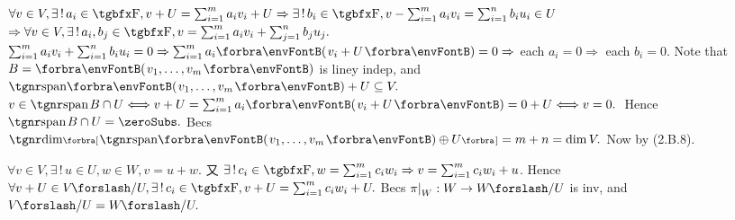 $\forall v\in V,\exists\,!\,a_i\in\Fbb,v+U=\sum_{i=1}^m a_i v_i+U\Rightarrow\exists\,!\,b_i\in\Fbb,v-\sum_{i=1}^m a_i v_i=\sum_{i=1}^n b_i u_i\in U$\parSol{\vspace{2pt}}
$\Rightarrow \forall v\in V,\exists\,!\,a_i,b_j\in\Fbb,v=\sum_{i=1}^m a_i v_i+\sum_{j=1}^n b_j u_j.$\PfEnd\parSol{\vspace{6pt}}
\Or $\sum_{i=1}^m a_i v_i+\sum_{i=1}^n b_i u_i=0\Rightarrow\sum_{i=1}^m a_i\Par{v_i+U}=0\Rightarrow$ each $a_i=0\Rightarrow$ each $b_i=0.$\PfEnd\parSol{\vspace{6pt}}
\Or Note that $B=\Par{v_1,\dots,v_m}$ is liney indep, and \:\!${\Span{v_1,\dots,v_m}+U}\subseteq V.$\parSol{}
$v\in\spn B\cap U\Longleftrightarrow v+U=\sum_{i=1}^ma_i\Par{v_i+U}=0+U\Longleftrightarrow v=0.$ \,Hence $\spn B\cap U=\zeroSubs.$\parSol{}
Becs $\Dim\Sbra{\Span{v_1,\dots,v_m}\oplus U}=m+n=\dim V.$ \;Now by (2.B.8).\PfEnd
\SepLine\pagebreak

$\forall v\in V,\exists\,!\,u\in U,w\in W,v=u+w.$ 又 $\exists\,!\,c_i\in\Fbb,w=\sum_{i=1}^m c_i w_i\Rightarrow v=\sum_{i=1}^m c_i w_i+u$.\parSol{}
Hence $\forall v+U\in V\XSlash U,\exists\,!\,c_i\in\Fbb,v+U=\sum_{i=1}^m c_i w_i+U.$\PfEnd\vspace{2pt}\parSol{}
\Or Becs $\pi\mmid_W:W\rightarrow W\XSlash U$ is inv, and $V\XSlash U=W\XSlash U.$\PfEnd
\SepLine

\def\Pure{{\textup{\tgnr Pure}}\,}


